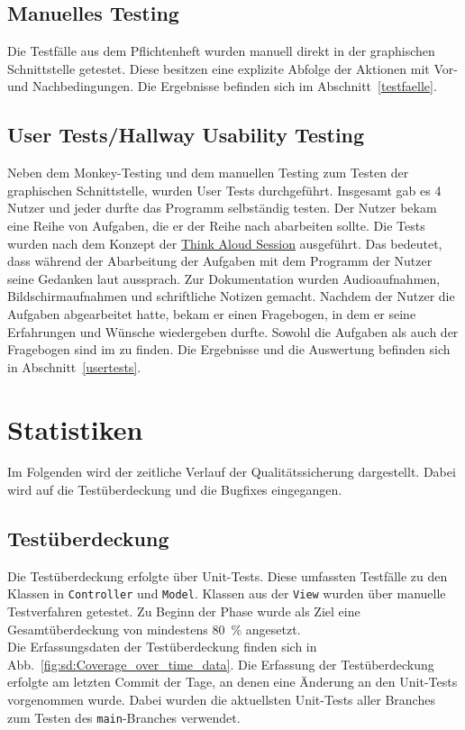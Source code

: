 \documentclass{article}
\begin{document}
\subsection*{Manuelles Testing}
Die Testfälle aus dem Pflichtenheft wurden manuell direkt in der graphischen Schnittstelle getestet. Diese besitzen eine explizite Abfolge der Aktionen mit Vor- und Nachbedingungen. Die Ergebnisse befinden sich im Abschnitt~\ref{testfaelle}.
\subsection*{User Tests/Hallway Usability Testing}
Neben dem Monkey-Testing und dem manuellen Testing zum Testen der graphischen Schnittstelle, wurden User Tests durchgeführt. Insgesamt gab es 4 Nutzer und jeder durfte das Programm selbständig testen. Der Nutzer bekam eine Reihe von Aufgaben, die er der Reihe nach abarbeiten sollte. Die Tests wurden nach dem Konzept der \href{https://en.wikipedia.org/wiki/Think\_aloud\_protocol}{Think Aloud Session} ausgeführt. Das bedeutet, dass während der Abarbeitung der Aufgaben mit dem Programm der Nutzer seine Gedanken laut aussprach. Zur Dokumentation wurden Audioaufnahmen, Bildschirmaufnahmen und schriftliche Notizen gemacht. Nachdem der Nutzer die Aufgaben abgearbeitet hatte, bekam er einen Fragebogen, in dem er seine Erfahrungen und Wünsche wiedergeben durfte. Sowohl die Aufgaben als auch der Fragebogen sind im  zu finden. Die Ergebnisse und die Auswertung befinden sich in Abschnitt~\ref{usertests}.
\newpage
\section{Statistiken} \label{statistiken}

Im Folgenden wird der zeitliche Verlauf der Qualitätssicherung dargestellt. Dabei wird auf die Testüberdeckung und die Bugfixes eingegangen.

\subsection{Testüberdeckung}

Die Testüberdeckung erfolgte über Unit-Tests. Diese umfassten Testfälle zu den Klassen in \texttt{Controller} und \texttt{Model}. Klassen aus der \texttt{View} wurden über manuelle Testverfahren getestet. Zu Beginn der Phase wurde als Ziel eine Gesamtüberdeckung von mindestens 80~\% angesetzt. 
\\
Die Erfassungsdaten der Testüberdeckung finden sich in Abb.~\ref{fig:sd:Coverage_over_time_data}. Die Erfassung der Testüberdeckung erfolgte am letzten Commit der Tage, an denen eine Änderung an den Unit-Tests vorgenommen wurde. Dabei wurden die aktuellsten Unit-Tests aller Branches zum Testen des \texttt{main}-Branches verwendet.  
\end{document}
